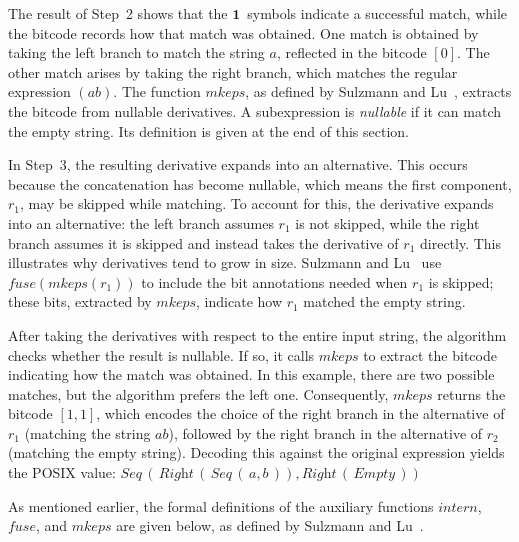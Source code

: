 \documentclass[12pt]{article}
\newcommand{\ONE}{\textbf{1}}
\newcommand{\fuse}{\textit{fuse}}
\newcommand{\mkeps}{\textit{mkeps}}
\newcommand{\intern}{\textit{intern}}
\newcommand{\Seq}{\textit{Seq}}
\newcommand{\Right}{\textit{Right}}
\newcommand{\Empty}{\textit{Empty}}
\begin{document}
The result of Step~2 shows that the $\ONE\,$ symbols indicate a successful match,  
while the bitcode records how that match was obtained.  
One match is obtained by taking the left branch to match the string $a$, reflected in the bitcode $[0]$.  
The other match arises by taking the right branch, which matches the regular expression $(ab)$.  
The function $\mkeps$, as defined by Sulzmann and Lu~\cite{Sulzmann2014}, extracts the bitcode from nullable derivatives.  
A subexpression is \emph{nullable} if it can match the empty string.  
Its definition is given at the end of this section.  

In Step~3, the resulting derivative expands into an alternative.  
This occurs because the concatenation has become nullable, which means the first component, $r_1$, may be skipped while matching.  
To account for this, the derivative expands into an alternative: the left branch assumes $r_1$ is not skipped, 
while the right branch assumes it is skipped and instead takes the derivative of $r_1$ directly.  
This illustrates why derivatives tend to grow in size.  
Sulzmann and Lu~\cite{Sulzmann2014} use $\fuse(\mkeps(r_1))$ to include the bit annotations needed when $r_1$ is skipped; 
these bits, extracted by $\mkeps$, indicate how $r_1$ matched the empty string.  

After taking the derivatives with respect to the entire input string, the algorithm checks whether the result is nullable.  
If so, it calls $\mkeps$ to extract the bitcode indicating how the match was obtained.  
In this example, there are two possible matches, but the algorithm prefers the left one.  
Consequently, $\mkeps$ returns the bitcode $[1,1]$, which encodes the choice of the right branch in the alternative of $r_1$ 
(matching the string $ab$), followed by the right branch in the alternative of $r_2$  (matching the empty string).
Decoding this against the original expression yields the POSIX value:
$
\Seq\,(\,\Right\,(\,\Seq\,(\,a, b\,)), \Right\,(\,\Empty\,))
$

As mentioned earlier, the formal definitions of the auxiliary functions $\intern$, $\fuse$, and $\mkeps$ are given below, 
as defined by Sulzmann and Lu~\cite{Sulzmann2014}.

\end{document}
